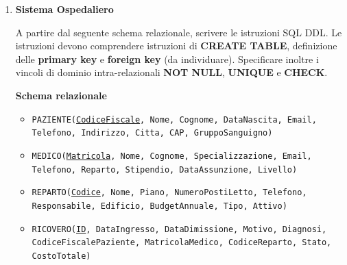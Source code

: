 \documentclass[a4paper,12pt]{article}
\begin{document}
\begin{enumerate}
\textbf{Schema relazionale}
\begin{itemize}
    \item \texttt{CLIENTE(\underline{ID}, Nome, Cognome, Email, Telefono, Password, Indirizzo, Citta, CAP, DataRegistrazione)}
    \item \texttt{PRODOTTO(\underline{Codice}, Nome, Descrizione, Prezzo, QuantitaMagazzino, Categoria, Peso, Marca, DataInserimento, Attivo)}
    \item \texttt{ORDINE(\underline{ID}, DataOrdine, Stato, Totale, MetodoPagamento, IndirizzoSpedizione, CittaSpedizione, CAPSpedizione, IDCliente, DataSpedizione)}
    \item \texttt{DETTAGLIO\_ORDINE(\underline{IDOrdine}, \underline{CodiceProdotto}, Quantita, PrezzoUnitario, ScontoPercentuale, IVA, TotaleRiga, StatoRiga, DataConsegnaPrevista, Reso)}
\end{itemize}

\textbf{Vincoli di dominio}
\begin{itemize}
\item Email univoca.
\item Prezzo > 0.
\item QuantitaMagazzino >= 0.
\item Quantita > 0.
\item ScontoPercentuale tra 0 e 100.
\item IVA tra 0 e 100.
\item Totale >= 0.
\end{itemize}
\newpage





\item \textbf{Sistema Ospedaliero}

A partire dal seguente schema relazionale, scrivere le istruzioni SQL DDL.
Le istruzioni devono comprendere istruzioni di \textbf{CREATE TABLE}, definizione delle \textbf{primary key} e \textbf{foreign key} (da individuare). Specificare inoltre i vincoli di dominio intra-relazionali \textbf{NOT NULL}, \textbf{UNIQUE} e \textbf{CHECK}.

\textbf{Schema relazionale}
\begin{itemize}
    \item \texttt{PAZIENTE(\underline{CodiceFiscale}, Nome, Cognome, DataNascita, Email, Telefono, Indirizzo, Citta, CAP, GruppoSanguigno)}
    \item \texttt{MEDICO(\underline{Matricola}, Nome, Cognome, Specializzazione, Email, Telefono, Reparto, Stipendio, DataAssunzione, Livello)}
    \item \texttt{REPARTO(\underline{Codice}, Nome, Piano, NumeroPostiLetto, Telefono, Responsabile, Edificio, BudgetAnnuale, Tipo, Attivo)}
    \item \texttt{RICOVERO(\underline{ID}, DataIngresso, DataDimissione, Motivo, Diagnosi, \\CodiceFiscalePaziente, MatricolaMedico, CodiceReparto, Stato, CostoTotale)}
\end{itemize}


\end{enumerate}
\end{document}
